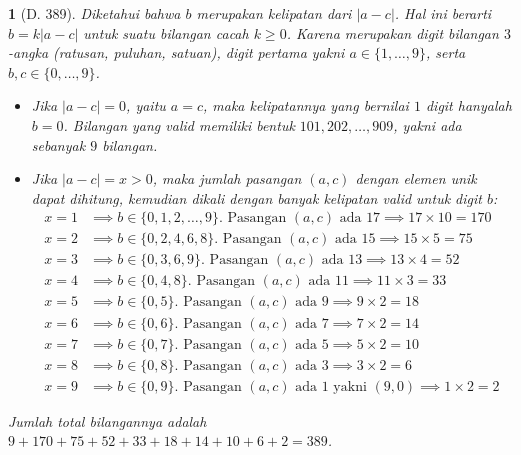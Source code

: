 \documentclass[11pt,a4paper,DIV=12]{scrartcl}
\theoremstyle{problemstyle}
\theoremstyle{answerstyle}
\newtheorem{answer}{}
\begin{document}
\begin{answer}[D. 389]
  Diketahui bahwa $b$ merupakan kelipatan dari $|a-c|$. Hal ini berarti $b = k|a-c|$ untuk suatu bilangan cacah $k \ge 0$.
  Karena merupakan digit bilangan $3$-angka (ratusan, puluhan, satuan), digit pertama yakni $a \in \{1,\dots,9\}$, serta $b,c \in \{0,\dots,9\}$.

  \begin{itemize}
    \item Jika $|a-c| = 0$, yaitu $a = c$, maka kelipatannya yang bernilai $1$ digit hanyalah $b = 0$.
          Bilangan yang valid memiliki bentuk $101, 202, \dots, 909$, yakni ada sebanyak $9$ bilangan.
    \item Jika $|a-c| = x > 0$, maka jumlah pasangan $(a,c)$ dengan elemen unik dapat dihitung, kemudian dikali dengan banyak kelipatan valid untuk digit $b$:
          \begin{align*}
            x=1 & \implies b \in \{0,1,2,\dots,9\}. \text{ Pasangan } (a,c) \text{ ada } 17 \implies 17 \times 10 = 170       \\
            x=2 & \implies b \in \{0,2,4,6,8\}. \text{ Pasangan } (a,c) \text{ ada } 15 \implies 15 \times 5 = 75             \\
            x=3 & \implies b \in \{0,3,6,9\}. \text{ Pasangan } (a,c) \text{ ada } 13 \implies 13 \times 4 = 52               \\
            x=4 & \implies b \in \{0,4,8\}. \text{ Pasangan } (a,c) \text{ ada } 11 \implies 11 \times 3 = 33                 \\
            x=5 & \implies b \in \{0,5\}. \text{ Pasangan } (a,c) \text{ ada } 9 \implies 9 \times 2 = 18                     \\
            x=6 & \implies b \in \{0,6\}. \text{ Pasangan } (a,c) \text{ ada } 7 \implies 7 \times 2 = 14                     \\
            x=7 & \implies b \in \{0,7\}. \text{ Pasangan } (a,c) \text{ ada } 5 \implies 5 \times 2 = 10                     \\
            x=8 & \implies b \in \{0,8\}. \text{ Pasangan } (a,c) \text{ ada } 3 \implies 3 \times 2 = 6                      \\
            x=9 & \implies b \in \{0,9\}. \text{ Pasangan } (a,c) \text{ ada } 1 \text{ yakni } (9,0) \implies 1 \times 2 = 2
          \end{align*}
  \end{itemize}
  Jumlah total bilangannya adalah $9 + 170 + 75 + 52 + 33 + 18 + 14 + 10 + 6 + 2 = \boxed{389}$.
\end{answer}
\end{document}
